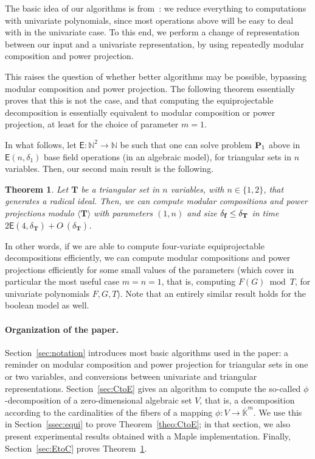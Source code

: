 \documentclass[12pt]{article}
\def\EE {\ensuremath{\mathsf{E}}}
\def\N {\ensuremath{\mathbb{N}}}
\def\Kbar {\ensuremath{\overline{\mathbb{K}}}}
\def\Tt {\ensuremath{\mathbf{T}}}
\def\Ot {O\tilde{~}}
\newtheorem{Theo}{Theorem}
\begin{document}
The basic idea of our algorithms is from~\cite{PoSc10}: we reduce
everything to computations with univariate polynomials, since most
operations above will be easy to deal with in the univariate case. To
this end, we perform a change of representation between our input and
a univariate representation, by using repeatedly modular composition
and power projection.

This raises the question of whether better algorithms may be possible,
bypassing modular composition and power projection.  The following
theorem essentially proves that this is not the case, and that
computing the equiprojectable decomposition is essentially equivalent
to modular composition or power projection, at least for the choice of
parameter $m=1$.

In what follows, let $\EE: \N^2 \to \N$ be such that one can solve
problem ${\bf P}_1$ above in $\EE(n,\delta_1)$ base field operations
(in an algebraic model), for triangular sets in $n$ variables. Then,
our second main result is the following.

\begin{Theo}
  \label{theo:EtoC}
  Let $\Tt$ be a triangular set in $n$ variables, with $n\in\{1,2\}$,
  that generates a radical ideal. Then, we can compute modular
  compositions and power projections modulo $\langle \Tt \rangle$ with
  parameters $(1,n)$ and size $\delta_{\bf f} \le \delta_\Tt$ in time
  $2\EE(4,\delta_\Tt)+\Ot(\delta_\Tt)$.
\end{Theo}
\noindent In other words, if we are able to compute four-variate
equiprojectable decompositions efficiently, we can compute modular
compositions and power projections efficiently for some small values
of the parameters (which cover in particular the most useful case
$m=n=1$, that is, computing $F(G) \bmod T$, for univariate polynomials
$F,G,T$). Note that an entirely similar result holds for the boolean
model as well.

\paragraph{Organization of the paper.} 
Section~\ref{sec:notation} introduces most basic algorithms used in
the paper: a reminder on modular composition and power projection for
triangular sets in one or two variables, and conversions between
univariate and triangular representations. Section~\ref{sec:CtoE}
gives an algorithm to compute the so-called $\phi$-decomposition of a
zero-dimensional algebraic set $V$, that is, a decomposition according
to the cardinalities of the fibers of a mapping $\phi:V \to
\Kbar^m$. We use this in Section~\ref{ssec:equi} to prove
Theorem~\ref{theo:CtoE}; in that section, we also present experimental
results obtained with a Maple implementation. Finally,
Section~\ref{sec:EtoC} proves Theorem~\ref{theo:EtoC}.
\end{document}
